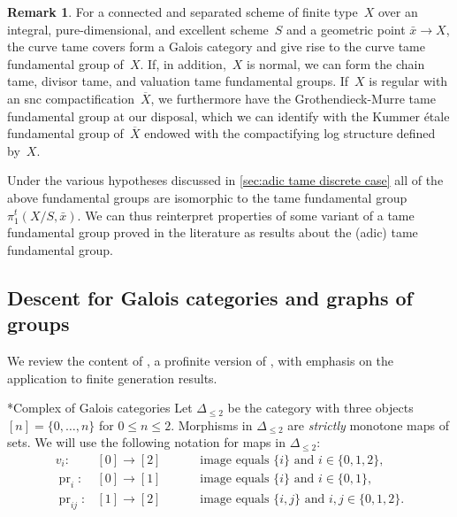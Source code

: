 \documentclass[a4paper,twoside,11pt,reqno]{amsart}
\makeatletter
\DeclareMathOperator{\pr}{pr}
\newcommand{\ov}[1]{\overline{#1}}
\def\subsubsection{\@startsection{subsubsection}{3}%
      \z@{.5\linespacing\@plus.7\linespacing}{-.5em}%
      {\normalfont\bfseries}}
\theoremstyle{definition}
\newtheorem{rmk}[thm]{Remark}
\numberwithin{equation}{subsection}
\makeatother
\begin{document}
\begin{rmk}
For a connected and separated scheme of finite type~$X$ over an integral, pure-dimensional, and excellent scheme~$S$ and a geometric point $\bar{x} \to X$, the curve tame covers form a Galois category and give rise to the curve tame fundamental group of~$X$.
If, in addition,~$X$ is normal, we can form the chain tame, divisor tame, and valuation tame fundamental groups.
If~$X$ is regular with an snc compactification~$\ov X$, we furthermore have the Grothendieck-Murre tame fundamental group at our disposal, which we can identify with the Kummer étale fundamental group of~$\ov X$ endowed with the compactifying log structure defined by~$X$. 

Under the various hypotheses discussed in \cref{sec:adic tame discrete case} all of the above fundamental groups are isomorphic to the tame fundamental group $\pi_1^t(X/S,\bar{x})$.
We can thus reinterpret properties of some variant of a tame fundamental group proved in the literature as results about the (adic) tame fundamental group.
\end{rmk}


\subsection{Descent for Galois categories and graphs of groups}
\label{sec:descent for Gal cats}

We review the content of \cite{Stix2006:vanKampen}, a profinite version of \cite{HaefligerComplexesGroups}, with emphasis on the application to finite generation results. 

\subsubsection*{Complex of Galois categories}
Let $\Delta_{\leq 2}$ be the category with three objects $[n] = \{0,\ldots,n\}$ for $0 \leq n \leq 2$. Morphisms in $\Delta_{\leq 2}$ are \emph{strictly} monotone maps of sets. We will use the following notation for maps in $\Delta_{\leq 2}$:
\[
\begin{array}{rll}
    v_i \colon & [0] \to [2] & \qquad \text{ image equals $\{i\}$ and $i \in \{0,1,2\}$,} \\[1ex]
    \pr_{i} \colon & [0] \to [1] & \qquad \text{ image equals $\{i\}$ and $i \in \{0,1\}$,} \\[1ex] 
    \pr_{ij} \colon & [1] \to [2] & \qquad  \text{ image equals $\{i,j\}$ and $i,j \in \{0,1,2\}$.}
\end{array}
\]
\end{document}
